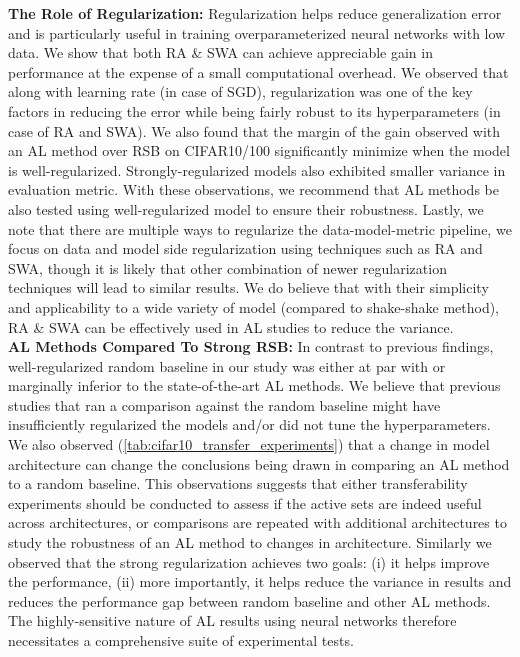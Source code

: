 \documentclass[10pt,twocolumn,letterpaper]{article}
\begin{document}
\noindent \textbf{The Role of Regularization:} Regularization helps reduce generalization error and is particularly useful in training overparameterized neural networks with low data. We show that both RA \& SWA can achieve appreciable gain in performance at the expense of a small computational overhead. We observed that along with learning rate (in case of SGD), regularization was one of the key factors in reducing the error while being fairly robust to its hyperparameters (in case of RA and SWA). We also found that the margin of the gain observed with an AL method over RSB on CIFAR10/100 significantly minimize when the model is well-regularized. Strongly-regularized models also exhibited smaller variance in evaluation metric. With these observations, we recommend that AL methods be also tested using well-regularized model to ensure their robustness. Lastly, we note that there are multiple ways to regularize the data-model-metric pipeline, we focus on data and model side regularization using techniques such as RA and SWA, though it is likely that other combination of newer regularization techniques will lead to similar results. We do believe that with their simplicity and applicability to a wide variety of model (compared to shake-shake method), RA \& SWA can be effectively used in AL studies to reduce the variance.\\


\noindent \textbf{AL Methods Compared To Strong RSB:} In contrast to previous findings, well-regularized random baseline in our study was either at par with or marginally inferior to the state-of-the-art AL methods. We believe that previous studies that ran a comparison against the random baseline might have insufficiently regularized the models and/or did not tune the hyperparameters. We also observed (\cref{tab:cifar10_transfer_experiments}) that a change in model architecture can change the conclusions being drawn in comparing an AL method to a random baseline. This observations suggests that either transferability experiments should be conducted to assess if the active sets are indeed useful across architectures, or comparisons are repeated with additional architectures to study the robustness of an AL method to changes in architecture. Similarly we observed that the strong regularization achieves two goals: (i) it helps improve the performance, (ii) more importantly, it helps reduce the variance in results and reduces the performance gap between random baseline and other AL methods. The highly-sensitive nature of AL results using neural networks therefore necessitates a comprehensive suite of experimental tests.
\end{document}
